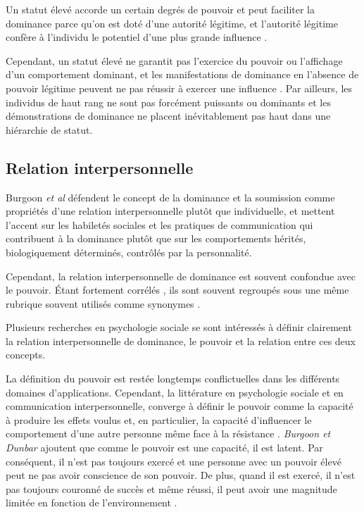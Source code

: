 	Un statut élevé accorde un certain degrés de pouvoir et peut faciliter la dominance parce qu'on est doté d'une autorité légitime, et l'autorité légitime confère à l'individu le potentiel d'une plus grande influence \cite{burgoon2006nonverbal}. 
	
	Cependant, un statut élevé ne garantit pas l'exercice du pouvoir ou l'affichage d'un comportement dominant, et les manifestations de dominance en l'absence de pouvoir légitime peuvent ne pas réussir à exercer une influence \cite{ridgeway1995legitimacy}.
	Par ailleurs, les individus de haut rang ne sont pas forcément puissants ou dominants et les démonstrations de dominance ne placent inévitablement pas haut dans une hiérarchie de statut\cite{burgoonnonverbal}.
	
	\subsection{Relation interpersonnelle}
		Burgoon \emph{et al} \cite{burgoon1998nature} défendent le concept de la dominance et la soumission comme propriétés d'une relation interpersonnelle plutôt que individuelle, et mettent l'accent sur les habiletés sociales et les pratiques de communication qui contribuent à la dominance plutôt que sur les comportements hérités, biologiquement déterminés, contrôlés par la personnalité.
		
		Cependant, la relation interpersonnelle de dominance est souvent confondue avec le pouvoir. Étant fortement corrélés \cite{dunbar2005perceptions}, ils sont souvent regroupés sous une même rubrique souvent utilisés comme synonymes  \cite{ellyson1985power,burgoon1998nature}.
		
		Plusieurs recherches en psychologie sociale \cite{burgoon1998nature,dunbar2005perceptions,burgoon2006nonverbal} se sont intéressés à définir clairement la relation interpersonnelle de dominance, le pouvoir et la relation entre ces deux concepts. 
		
		
		La définition du pouvoir est  restée longtemps conflictuelles dans les différents domaines d'applications. Cependant, la littérature en psychologie sociale et en communication interpersonnelle, converge à définir le pouvoir comme la capacité à produire les effets voulus et, en particulier, la capacité d'influencer le comportement d'une autre personne même face à la résistance  \cite{burgoon2000interactionist,burgoon2006nonverbal,huston1983power}.
		\emph{Burgoon et Dunbar} \cite{burgoon1998nature,dunbar2005perceptions} ajoutent que comme le pouvoir est une capacité, il est latent. Par conséquent, il n'est pas toujours exercé et une personne avec un pouvoir élevé peut ne pas avoir conscience de son pouvoir. De plus, quand il est exercé, il n'est pas toujours couronné de succès et même réussi, il peut avoir une magnitude limitée en fonction de l'environnement \cite{huston1983power}.
		
